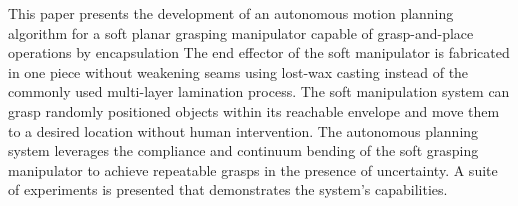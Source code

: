 This paper presents the development of an autonomous motion planning algorithm for a soft planar grasping manipulator capable of grasp-and-place operations by encapsulation
The end effector of the soft manipulator is fabricated in one piece without weakening seams using lost-wax casting instead of the commonly used multi-layer lamination process.
The soft manipulation system can grasp randomly positioned objects within its reachable envelope and move them to a desired location without human intervention.
The autonomous planning system leverages the compliance and continuum bending of the soft grasping manipulator to achieve repeatable grasps in the presence of uncertainty.
A suite of experiments is presented that demonstrates the system's capabilities.